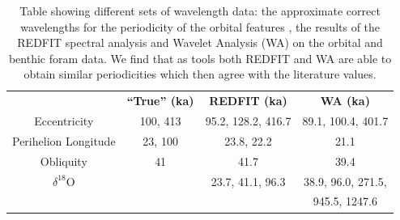 \documentclass[12pt, onecolumn]{revtex4}    %
\begin{document}
\begin{table}[h!]
\centering
\begin{tabular}{c@{\hskip 20pt}c@{\hskip 20pt}c@{\hskip 20pt}c} 
 \hline
  & \textbf{``True'' (ka)} &\textbf{REDFIT (ka)} & \textbf{WA (ka)} \\ [0.5ex] 
 Eccentricity & 100, 413 & 95.2, 128.2, 416.7 & 89.1, 100.4,  401.7\\
 Perihelion Longitude & 23, 100 & 23.8, 22.2 & 21.1 \\
 Obliquity & 41 & 41.7 & 39.4 \\
 $\delta^{18}$O & & 23.7, 41.1, 96.3  & 38.9, 96.0, 271.5, \\
 & & & 945.5, 1247.6 \\
 \hline
\end{tabular}
\caption{Table showing different sets of wavelength data: the approximate correct wavelengths for the periodicity of the orbital features \cite{campisano_milankovitch}, the results of the REDFIT spectral analysis and Wavelet Analysis (WA) on the orbital and benthic foram data. We find that as tools both REDFIT and WA are able to obtain similar periodicities which then agree with the literature values. }
\vspace{-0.5em}
\label{table:final_results}
\end{table}
\end{document}
